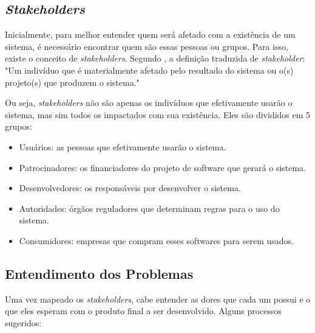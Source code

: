 \subsection{\textit{Stakeholders}}
Inicialmente, para melhor entender quem será afetado com a existência de um sistema, é necessário encontrar quem são essas pessoas ou grupos. Para isso, existe o conceito de \textit{stakeholders}. Segundo \cite[cap. ~3, p. ~88]{kurtbittnerianspence2002}, a definição traduzida de \textit{stakeholder}: "Um indivíduo que é materialmente afetado pelo resultado do sistema ou o(s) projeto(s) que produzem o sistema."

Ou seja, \textit{stakeholders} não são apenas os indivíduos que efetivamente usarão o sistema, mas sim todos os impactados com sua existência. Eles são divididos em 5 grupos:

\begin{itemize}
    \item Usuários: as pessoas que efetivamente usarão o sistema.
    \item Patrocinadores: os financiadores do projeto de software que gerará o sistema.
    \item Desenvolvedores: os responsáveis por desenvolver o sistema.
    \item Autoridades: órgãos reguladores que determinam regras para o uso do sistema.
    \item Consumidores: empresas que compram esses softwares para serem usados.
\end{itemize}

\subsection{Entendimento dos Problemas}

Uma vez mapeado os \textit{stakeholders}, cabe entender as dores que cada um possui e o que eles esperam com o produto final a ser desenvolvido. Alguns processos sugeridos\cite{kurtbittnerianspence2002}:

